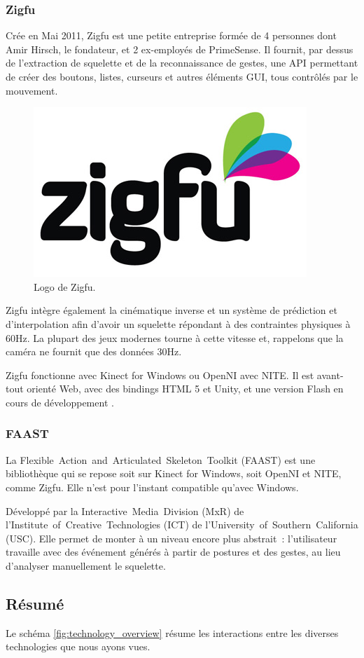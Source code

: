 \subsubsection{Zigfu}
Crée en Mai 2011, Zigfu est une petite entreprise formée de 4 personnes dont 
Amir Hirsch, le fondateur, et 2 ex-employés de PrimeSense. Il fournit, 
par dessus de l'extraction de squelette et de la reconnaissance
de gestes, une API permettant de créer des boutons, listes, curseurs et autres
éléments GUI, tous contrôlés par le mouvement.
\begin{figure}[h!]
\centering
\includegraphics[width=0.3\linewidth]{images/zigfu_logo}
\caption{Logo de Zigfu.}
\end{figure}
Zigfu intègre également la cinématique inverse et un système de 
prédiction et
d'interpolation afin d'avoir un squelette répondant à des contraintes 
physiques à 60Hz\cite{zigfu_video}. La plupart des jeux modernes tourne à cette 
vitesse et, 
rappelons que la caméra ne fournit que des données 30Hz.

Zigfu fonctionne avec Kinect for Windows ou OpenNI avec NITE. Il est 
avant-tout orienté Web, avec des
bindings HTML 5 et Unity, et une version Flash en cours de développement
\cite{zigfu_review}.

\subsubsection{FAAST}
La Flexible~Action~and~Articulated~Skeleton~Toolkit (FAAST) est une 
bibliothèque qui se repose soit sur Kinect for Windows, soit OpenNI et NITE, 
comme Zigfu. Elle n'est pour l'instant compatible qu'avec Windows.

Développé par la Interactive~Media~Division (MxR) de 
l'Institute~of~Creative~Technologies (ICT) de 
l'University~of~Southern~California (USC). Elle permet de monter à un niveau 
encore plus abstrait~: l'utilisateur travaille avec des événement générés à
partir de postures et des gestes, au lieu d'analyser manuellement le 
squelette.


\subsection{Résumé}
Le schéma \ref{fig:technology_overview} résume les interactions entre les diverses 
technologies que nous ayons vues.

